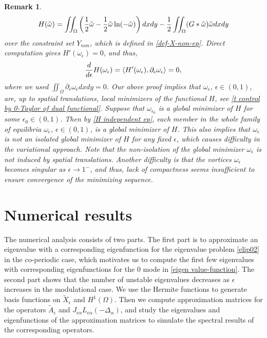 \documentclass[1 [leqno, 11pt]{amsart}
\numberwithin{equation}{section}
\let\ep=\epsilon
\newtheorem{remark}[Theorem]{Remark}
\begin{document}
\begin{CJK*}{GBK}{song}
\begin{remark}
\begin{align*}
H(\tilde \omega)=\iint_{\Omega}\left({1\over 2}\tilde \omega-{1\over2}\tilde \omega\ln(-\tilde \omega)\right) dxdy-{1\over 2}\iint_\Omega(G*\tilde \omega)\tilde \omega dxdy
\end{align*}
over the constraint set $ Y_{non}$, which is defined in \eqref{def-X-non-ep}.
Direct computation gives $H'(\omega_\ep)=0$, and thus,
\begin{align}\label{H independent ep}
{d\over d\ep}H (\omega_\ep)=\langle H'(\omega_\ep),\partial_\ep\omega_\ep\rangle=0,
\end{align}
where we used  $\iint_\Omega\partial_\ep\omega_\ep dxdy=0$.
Our above  proof implies that $\omega_\ep$, $\ep\in(0,1)$, are, up to spatial translations,  local minimizers of the functional $H$, see \eqref{t control by 0-Taylor of dual functional}. Suppose that $\omega_{\ep_0}$ is a global minimizer of $H$ for some $\ep_0\in(0,1)$. Then by \eqref{H independent ep}, each member in  the whole family of equilibria $\omega_\ep$, $\ep\in(0,1)$, is a global minimizer of $H$. This also implies that $\omega_\ep$ is not an isolated global minimizer of $H$ for any fixed $\ep$, which causes difficulty in the variational approach. Note that the non-isolation of the global minimizer $\omega_\ep$ is not induced by spatial translations. Another difficulty is that the vortices $\omega_\ep$ becomes singular as $\ep\to1^-$, and thus, lack of compactness seems insufficient to ensure convergence of the minimizing sequence.
\end{remark}
\section{Numerical results}\label{Numerical Results}

The numerical analysis consists of two parts. The first part is to approximate an eigenvalue with a corresponding  eigenfunction for the eigenvalue problem \eqref{elip02} in the co-periodic case, which motivates us to compute the first few eigenvalues with corresponding eigenfunctions for the $0$ mode in \eqref{eigen value-function}.
The second part shows that the number of unstable eigenvalues decreases as $\ep$ increases in the modulational case.
We use the Hermite functions to generate basis functions on $\tilde{X}_\ep$ and $H^1(\Omega)$. Then we compute approximation matrices for the operators $\tilde{A}_\ep$ and $J_{\ep\alpha} L_{\ep\alpha}(-\Delta_\alpha)$, and study the eigenvalues and eigenfunctions of the approximation matrices to simulate  the spectral results of the corresponding operators.
\fi
{}

\end{CJK*}
\end{document}
